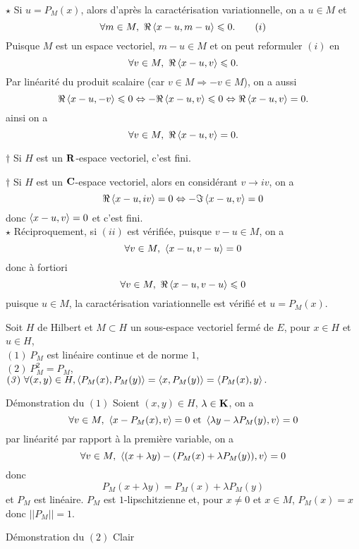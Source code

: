 \documentclass[a4paper,11pt, twoside]{article}
\begin{document}
\begin{Proof}
  $\star$ Si $u=P_M(x)$, alors d'après la caractérisation variationnelle, on a $u\in M$ et 
  $$\forall m\in M,\ \Re\ps{x-u,m-u}\leqslant 0.\qquad (i)$$
  Puisque $M$ est un espace vectoriel, $m-u\in M$ et on peut reformuler $(i)$ en 
  $$\forall v\in M,\ \Re\left\langle x-u,v \right\rangle\leqslant 0.$$
  Par linéarité du produit scalaire (car $v\in M\Rightarrow -v\in M$), on a aussi 
  $$\Re\left\langle x-u,-v \right\rangle\leqslant 0\Leftrightarrow-\Re\left\langle x-u,v \right\rangle\leqslant 0\Leftrightarrow \Re\left\langle x-u,v \right\rangle=0.$$
  ainsi on a 
  $$\forall v\in M,\ \Re\left\langle x-u,v \right\rangle=0.$$

  $\dagger$ Si $H$ est un $\mathbf R$-espace vectoriel, c'est fini.

  $\dagger$ Si $H$ est un $\mathbf C$-espace vectoriel, alors en considérant $v\to iv$, on a 
  $$\Re\left\langle x-u,iv \right\rangle=0\Leftrightarrow -\Im\left\langle x-u,v \right\rangle=0$$
  donc $\left\langle x-u,v \right\rangle=0$ et c'est fini.\\

  $\star$ Réciproquement, si $(ii)$ est vérifiée, puisque $v-u\in M$, on a 
  $$\forall v\in M,\ \ps{x-u,v-u}=0$$ 
  donc à fortiori
  $$\forall v\in M,\ \Re\ps{x-u,v-u}\leqslant0$$
  puisque $u\in M$, la caractérisation variationnelle est vérifié et $u=P_M(x).$
\end{Proof}

\begin{corollaire}
  Soit $H$ de Hilbert et $M\subset H$ un sous-espace vectoriel fermé de $E$, pour $x\in H$ et $u\in H$,\\
  
  $(\mathit 1)\ P_M$ est linéaire continue et de norme $1$,\\
  $(\mathit 2)\ P_M^2=P_M$,\\
  $(\mathit 3) \ \forall (x,y)\in H, \left\langle P_M(x),P_M(y) \right\rangle=\left\langle x,P_M(y) \right\rangle=\left\langle P_M(x),y \right\rangle.$
\end{corollaire}


\begin{ProofC}{Démonstration du $(\mathit 1)$}
  Soient $(x,y)\in H$, $\lambda\in\mathbf K$, on a 
  $$\forall v\in M,\ \left\langle x-P_M(x),v \right\rangle=0\text{ et }\left\langle \lambda y-\lambda P_M(y),v \right\rangle=0$$
  par linéarité par rapport à la première variable, on a 
  $$\forall v\in M,\ \ps{(x+\lambda y)-(P_M(x)+\lambda P_M(y)),v}=0$$
  donc 
  $$P_M(x+\lambda y)=P_M(x)+\lambda P_M(y)$$
  et $P_M$ est linéaire.
  $P_M$ est $1$-lipschitzienne et, pour $x\neq 0$ et $x\in M$, $P_M(x)=x$ donc $||P_M||=1.$
\end{ProofC}


\begin{ProofC}{Démonstration du $(\mathit 2)$}
    Clair
\end{ProofC}
\end{document}
